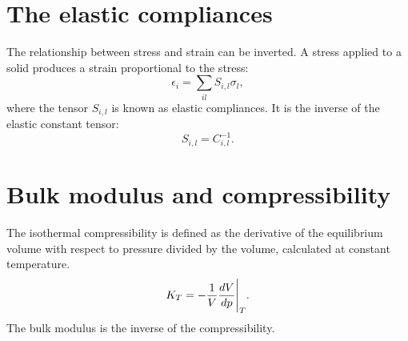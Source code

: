 \documentclass[12pt,a4paper]{article}
\begin{document}
%
%
\newpage
\section{\color{coral}The elastic compliances}
The relationship between stress and strain can be inverted. A stress 
applied to a solid produces a strain proportional to the stress:
\begin{equation}
\epsilon_{i} =\sum_{il} S_{i,l} \sigma_l, 
\end{equation}
where the tensor $S_{i,l}$ is known as elastic compliances. It is the
inverse of the elastic constant tensor: 
\begin{equation}
S_{i,l} = C_{i,l}^{-1}.
\end{equation}


\newpage
\section{\color{coral}Bulk modulus and compressibility}

The isothermal compressibility is defined as the derivative of the 
equilibrium volume with respect to pressure divided by the volume,
calculated at constant temperature.
\begin{equation}
K_T = - {1 \over V} {d V \over d p}\Bigg|_T.
\end{equation}
The bulk modulus is the inverse of the compressibility. 
\end{document}
